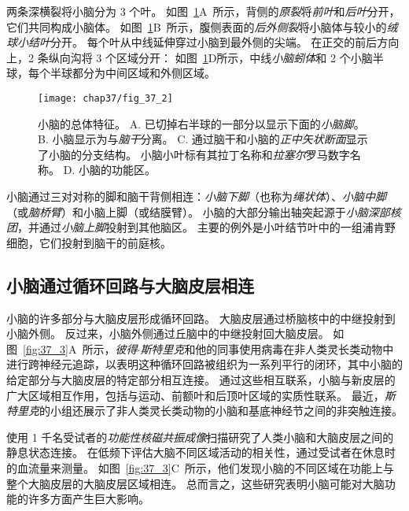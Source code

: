 两条深横裂将小脑分为 3 个叶。
如图~\ref{fig:37_2}A~所示，背侧的\textit{原裂}将\textit{前叶}和\textit{后叶}分开，它们共同构成小脑体。
如图~\ref{fig:37_2}B~所示，腹侧表面的\textit{后外侧裂}将小脑体与较小的\textit{绒球小结叶}分开。
每个叶从中线延伸穿过小脑到最外侧的尖端。
在正交的前后方向上，2 条纵向沟将 3 个区域分开：
如图~\ref{fig:37_2}D所示，中线\textit{小脑蚓体}和 2 个小脑半球，每个半球都分为中间区域和外侧区域。


\begin{figure}[htbp]
	\centering
	\texttt{[image: chap37/fig\_37\_2]}
	\caption{小脑的总体特征\cite{nieuwenhuys2007human}。
		A. 已切掉右半球的一部分以显示下面的\textit{小脑脚}。
		B. 小脑显示为与\textit{脑干}分离。
		C. 通过脑干和小脑的\textit{正中矢状断面}显示了小脑的分支结构。
		小脑小叶标有其拉丁名称和\textit{拉塞尔}罗马数字名称\cite{larsell1972comparative}。
		D. 小脑的功能区。}
	\label{fig:37_2}
\end{figure}


小脑通过三对对称的脚和脑干背侧相连：\textit{小脑下脚}（也称为\textit{绳状体}）、\textit{小脑中脚}（或\textit{脑桥臂}）和小脑上脚（或结膜臂）。
小脑的大部分输出轴突起源于\textit{小脑深部核团}，并通过\textit{小脑上脚}投射到其他脑区。
主要的例外是小叶结节叶中的一组浦肯野细胞，它们投射到脑干的前庭核。



\subsection{小脑通过循环回路与大脑皮层相连}

小脑的许多部分与大脑皮层形成循环回路。
大脑皮层通过桥脑核中的中继投射到小脑外侧。
反过来，小脑外侧通过丘脑中的中继投射回大脑皮层。
如图~\ref{fig:37_3}A~所示，\textit{彼得$\cdot$斯特里克}和他的同事使用病毒在非人类灵长类动物中进行跨神经元追踪，以表明这种循环回路被组织为一系列平行的闭环，其中小脑的给定部分与大脑皮层的特定部分相互连接。
通过这些相互联系，小脑与新皮层的广大区域相互作用，包括与运动、前额叶和后顶叶区域的实质性联系。
最近，\textit{斯特里克}的小组还展示了非人类灵长类动物的小脑和基底神经节之间的非突触连接。


使用 1 千名受试者的\textit{功能性核磁共振成像}扫描研究了人类小脑和大脑皮层之间的静息状态连接。
在低频下评估大脑不同区域活动的相关性，通过受试者在休息时的血流量来测量。
如图~\ref{fig:37_3}C~所示，他们发现小脑的不同区域在功能上与整个大脑皮层的大脑皮层区域相连。
总而言之，这些研究表明小脑可能对大脑功能的许多方面产生巨大影响。


